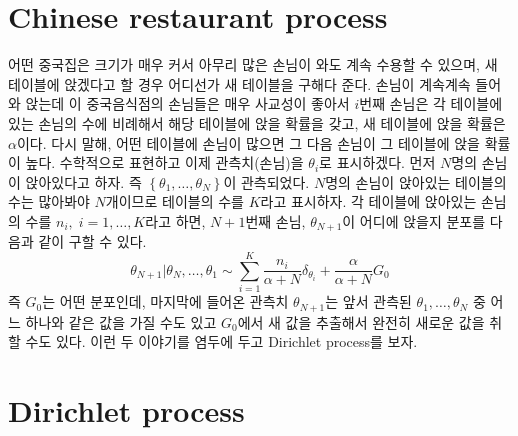 \documentclass[a4paper, 10pt]{book}
\begin{document}
\section{Chinese restaurant process}
어떤 중국집은 크기가 매우 커서 아무리 많은 손님이 와도 계속 수용할 수 있으며, 새 테이블에 앉겠다고 할 경우 어디선가 새 테이블을 구해다 준다. 손님이 계속계속 들어와 앉는데 이 중국음식점의 손님들은 매우 사교성이 좋아서 $i$번째 손님은 각 테이블에 있는 손님의 수에 비례해서 해당 테이블에 앉을 확률을 갖고, 새 테이블에 앉을 확률은 $\alpha$이다. 다시 말해, 어떤 테이블에 손님이 많으면 그 다음 손님이 그 테이블에 앉을 확률이 높다. 수학적으로 표현하고 이제 관측치(손님)을 $\theta_{i}$로 표시하겠다. 먼저 $N$명의 손님이 앉아있다고 하자. 즉 $\left\{\theta_{1},\ldots , \theta_{N}\right\}$이 관측되었다. $N$명의 손님이 앉아있는 테이블의 수는 많아봐야 $N$개이므로 테이블의 수를 $K$라고 표시하자. 각 테이블에 앉아있는 손님의 수를 $n_{i},\; i=1,\ldots, K$라고 하면, $N+1$번째 손님, $\theta_{N+1}$이 어디에 앉을지 분포를 다음과 같이 구할 수 있다.
\begin{equation}
  \theta_{N+1}|\theta_{N},\ldots , \theta_{1}\sim \sum_{i=1}^{K}\frac{n_{i}}{\alpha + N}\delta_{\theta_{i}} + \frac{\alpha}{\alpha + N}G_{0}
\end{equation}
즉 $G_{0}$는 어떤 분포인데, 마지막에 들어온 관측치 $\theta_{N+1}$는 앞서 관측된 $\theta_{1},\ldots,\theta_{N}$ 중 어느 하나와 같은 값을 가질 수도 있고 $G_{0}$에서 새 값을 추출해서 완전히 새로운 값을 취할 수도 있다. 이런 두 이야기를 염두에 두고 Dirichlet process를 보자.
\section{Dirichlet process}
\end{document}

